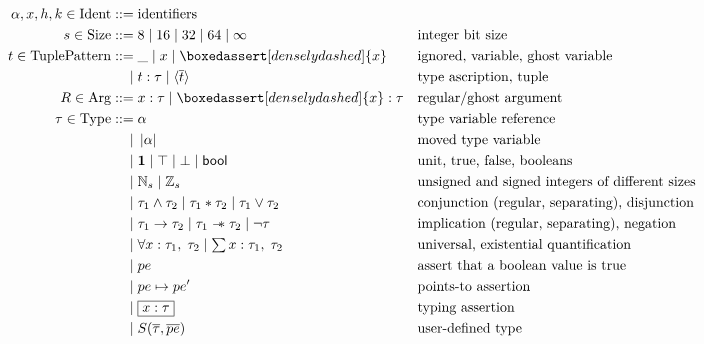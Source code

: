 \documentclass[acmsmall,nonacm]{acmart}
\newcommand*{\ghost}[1]{\boxedassert[densely dashed]{#1}}
\newcommand*{\N}{\mathbb{N}}
\newcommand*{\Z}{\mathbb{Z}}
\newcommand{\wand}{\mathrel{-\!\!\ast}}
\newcommand{\core}[1]{\left| #1 \right|}
\begin{document}
\begin{align*}
  \alpha,x,h,k\in \mathrm{Ident} ::={}& \mathrm{identifiers}\\
  s \in \mathrm{Size} ::={}& 8\mid 16\mid 32\mid 64\mid \infty&&\mbox{integer bit size}\\
  t \in \mathrm{TuplePattern} ::={}& \_\mid x\mid \ghost{x}&&\mbox{ignored, variable, ghost variable}\\
    \mid{}&t:\tau \mid \langle \overline{t}\rangle&&\mbox{type ascription, tuple}\\
  R \in \mathrm{Arg} ::={}& x:\tau\mid \ghost{x}:\tau&&\mbox{regular/ghost argument}\\
  \tau\in\mathrm{Type} ::={}& \alpha&&\mbox{type variable reference}\\
    \mid{}& \core\alpha&&\mbox{moved type variable}\\
    \mid{}&\mathbf{1}\mid\top\mid \bot\mid \mathsf{bool}&&\mbox{unit, true, false, booleans}\\
    \mid{}&\N_s\mid \Z_s&&\mbox{unsigned and signed integers of different sizes}\\
    \mid{}&\tau_1\land \tau_2\mid \tau_1\ast \tau_2\mid \tau_1\lor \tau_2&&\mbox{conjunction (regular, separating), disjunction}\\
    \mid{}&\tau_1\to \tau_2\mid \tau_1 \wand \tau_2\mid \neg \tau&&\mbox{implication (regular, separating), negation}\\
    \mid{}&\forall x:\tau_1,\;\tau_2\mid \textstyle\sum x:\tau_1,\;\tau_2&&\mbox{universal, existential quantification}\\
    \mid{}& pe&&\mbox{assert that a boolean value is true}\\
    \mid{}&pe\mapsto pe'&&\mbox{points-to assertion}\\
    \mid{}&\boxed{x:\tau}&&\mbox{typing assertion}\\
    \mid{}&S(\overline{\tau},\overline{pe})&&\mbox{user-defined type}\\
\end{align*}
\end{document}

